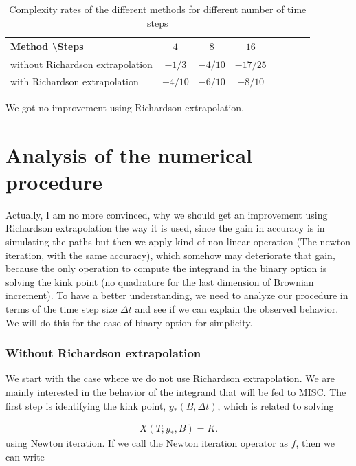 \documentclass[11pt]{article}
\begin{document}
\begin{table}[h!]
	\centering
	\begin{tabular}{l*{6}{c}r}
		Method \textbackslash  Steps             & $4$ & $8$ & $16$  \\
		\hline
		without Richardson  extrapolation & $-1/3$ & $-4/10$ & $-17/25$  \\
		with Richardson  extrapolation    & $-4/10$ & $-6/10$ & $-8/10$  \\
		\hline
	\end{tabular}
	\caption{Complexity rates of the different methods for different number of time steps}
	\label{table: Complexity rates of the different methods for different number of time steps_binary}
\end{table}	

We got no improvement using Richardson extrapolation. 

\section{Analysis of the numerical procedure}\label{sec:Analysis of the numerical procedure}

Actually, I am no more convinced, why we should get an improvement using Richardson extrapolation the way it is used, since the gain in accuracy is in simulating the paths but then we apply kind of non-linear operation (The newton iteration, with the same accuracy), which somehow may deteriorate that gain, because  the only operation to compute the integrand in the binary option is solving the kink point (no quadrature for the last dimension of Brownian increment). To have a better understanding, we need to analyze our procedure in terms of the time step size $\Delta t$ and see if we can explain the observed behavior. We will do this for the case of binary option for simplicity.
\subsubsection*{Without Richardson extrapolation}
We start with the case where we do not use Richardson extrapolation. We are mainly interested in the behavior of the integrand that will be fed to MISC. The first step is identifying the kink point, $y_{\ast}(B, \Delta t) $,  which is related to solving 

\begin{align}\label{eq: kink_point_problem_in_strike}
	X(T;y_{\ast},B)=K.
\end{align}
using Newton iteration. If we call the Newton iteration operator as $\bar{f}$, then we can write  
\end{document}
